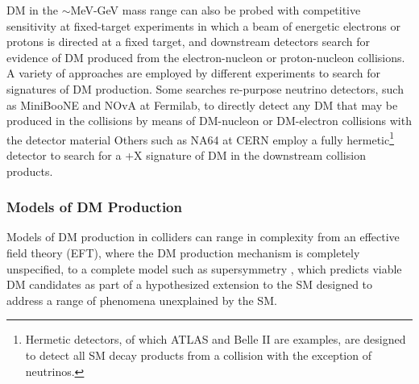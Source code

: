 DM in the \(\sim\)MeV-GeV mass range can also be probed with competitive sensitivity at fixed-target experiments in which a beam of energetic electrons or protons is directed at a fixed target, and downstream detectors search for evidence of DM produced from the electron-nucleon or proton-nucleon collisions. A variety of approaches are employed by different experiments to search for signatures of DM production. Some searches re-purpose neutrino detectors, such as MiniBooNE \cite{miniboone_2018} and NOvA \cite{nova_2017} at Fermilab, to directly detect any DM that may be produced in the collisions by means of DM-nucleon or DM-electron collisions with the detector material
Others such as NA64 \cite{na64_2019} at CERN employ a fully hermetic\footnote{Hermetic detectors, of which ATLAS and Belle II are examples, are designed to detect all SM decay products from a collision with the exception of neutrinos.} detector to search for a \met+X signature of DM in the downstream collision products.

\subsubsection{Models of DM Production}

Models of DM production in colliders can range in complexity from an effective field theory (EFT), where the DM production mechanism is completely unspecified, to a complete model such as supersymmetry \cite{susy_dm}, which predicts viable DM candidates as part of a hypothesized extension to the SM designed to address a range of phenomena unexplained by the SM. 


